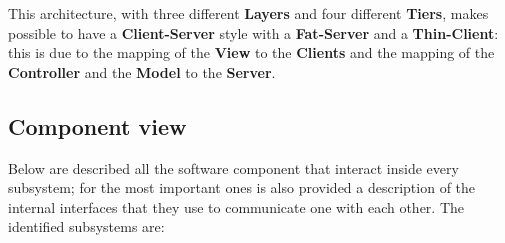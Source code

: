 This architecture, with three different \textbf{Layers} and four different \textbf{Tiers}, makes possible to have a \textbf{Client-Server} style with a \textbf{Fat-Server} and a \textbf{Thin-Client}: this is due to the mapping of the \textbf{View} to the \textbf{Clients} and the mapping of the \textbf{Controller} and the \textbf{Model} to the \textbf{Server}.

\subsection{Component view}
Below are described all the software component that interact inside every subsystem; for the most important ones is also provided a description of the internal interfaces that they use to communicate one with each other.
The identified subsystems are:
